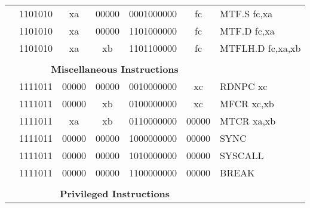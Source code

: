 \begin{table}[p]
\begin{small}
\begin{center}
\begin{tabular}{rcccccccccl}
&
\multicolumn{2}{|c|}{1101010} &
\multicolumn{1}{c|}{xa} &
\multicolumn{1}{c|}{00000} &
\multicolumn{4}{c|}{0001000000} &
\multicolumn{1}{c|}{fc} & MTF.S fc,xa \\
\cline{2-10}
  

&
\multicolumn{2}{|c|}{1101010} &
\multicolumn{1}{c|}{xa} &
\multicolumn{1}{c|}{00000} &
\multicolumn{4}{c|}{1101000000} &
\multicolumn{1}{c|}{fc} & MTF.D fc,xa \\
\cline{2-10}
  

&
\multicolumn{2}{|c|}{1101010} &
\multicolumn{1}{c|}{xa} &
\multicolumn{1}{c|}{xb} &
\multicolumn{4}{c|}{1101100000} &
\multicolumn{1}{c|}{fc} & MTFLH.D fc,xa,xb \\
\cline{2-10}
  

&
\multicolumn{9}{c}{} & \\
&
\multicolumn{9}{c}{\bf Miscellaneous Instructions} & \\
\cline{2-10}
  

&
\multicolumn{2}{|c|}{1111011} &
\multicolumn{1}{c|}{00000} &
\multicolumn{1}{c|}{00000} &
\multicolumn{4}{c|}{0010000000} &
\multicolumn{1}{c|}{xc} & RDNPC xc \\
\cline{2-10}
  

&
\multicolumn{2}{|c|}{1111011} &
\multicolumn{1}{c|}{00000} &
\multicolumn{1}{c|}{xb} &
\multicolumn{4}{c|}{0100000000} &
\multicolumn{1}{c|}{xc} & MFCR xc,xb \\
\cline{2-10}
  

&
\multicolumn{2}{|c|}{1111011} &
\multicolumn{1}{c|}{xa} &
\multicolumn{1}{c|}{xb} &
\multicolumn{4}{c|}{0110000000} &
\multicolumn{1}{c|}{00000} & MTCR xa,xb \\
\cline{2-10}
  

&
\multicolumn{2}{|c|}{1111011} &
\multicolumn{1}{c|}{00000} &
\multicolumn{1}{c|}{00000} &
\multicolumn{4}{c|}{1000000000} &
\multicolumn{1}{c|}{00000} & SYNC  \\
\cline{2-10}
  

&
\multicolumn{2}{|c|}{1111011} &
\multicolumn{1}{c|}{00000} &
\multicolumn{1}{c|}{00000} &
\multicolumn{4}{c|}{1010000000} &
\multicolumn{1}{c|}{00000} & SYSCALL  \\
\cline{2-10}
  

&
\multicolumn{2}{|c|}{1111011} &
\multicolumn{1}{c|}{00000} &
\multicolumn{1}{c|}{00000} &
\multicolumn{4}{c|}{1100000000} &
\multicolumn{1}{c|}{00000} & BREAK  \\
\cline{2-10}
  

&
\multicolumn{9}{c}{} & \\
&
\multicolumn{9}{c}{\bf Privileged Instructions} & \\
\cline{2-10}
  


\end{tabular}
\end{center}
\end{small}
\end{table}
